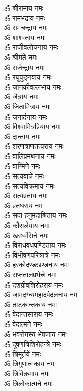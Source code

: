 \begin{multicols}{2}
\begin{flushleft}
ॐ श्रीरामाय नमः\\
ॐ रामभद्राय नमः\\
ॐ रामचन्द्राय नमः\\
ॐ शाश्वताय नमः\\
ॐ राजीवलोचनाय नमः\\
ॐ श्रीमते नमः\\
ॐ राजेन्द्राय नमः\\
ॐ रघुपुङ्गवाय नमः\\
ॐ जानकीवल्लभाय नमः\\
ॐ जैत्राय नमः\hfill{}\\
ॐ जितामित्राय नमः\\
ॐ जनार्दनाय नमः\\
ॐ विश्वामित्रप्रियाय नमः\\
ॐ दान्ताय नमः\\
ॐ शरणत्राणतत्पराय नमः\\
ॐ वालिप्रमथनाय नमः\\
ॐ वाग्मिने नमः\\
ॐ सत्यवाचे नमः\\
ॐ सत्यविक्रमाय नमः\\
ॐ सत्यव्रताय नमः\hfill{}\\
ॐ व्रतधराय नमः\\
ॐ सदा हनुमदाश्रिताय नमः\\
ॐ कौसलेयाय नमः\\
ॐ खरध्वंसिने नमः\\
ॐ विराधवधपण्डिताय नमः\\
ॐ विभीषणपरित्रात्रे नमः\\
ॐ हरकोदण्डखण्डनाय नमः\\
ॐ सप्ततालप्रभेत्त्रे नमः\\
ॐ दशग्रीवशिरोहराय नमः\\
ॐ जामदग्न्यमहादर्पदलनाय नमः\hfill{}\\
ॐ ताटकान्तकाय नमः\\
ॐ वेदान्तसाराय नमः\\
ॐ वेदात्मने नमः\\
ॐ भवरोगस्य भेषजाय नमः\\
ॐ दूषणत्रिशिरोहन्त्रे नमः\\
ॐ त्रिमूर्तये नमः\\
ॐ त्रिगुणात्मकाय नमः\\
ॐ त्रिविक्रमाय नमः\\
ॐ त्रिलोकात्मने नमः\\

\end{flushleft}
\end{multicols}
